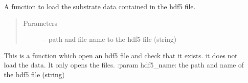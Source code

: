 \documentclass[letterpaper,10pt,english]{sphinxmanual}
\begin{document}

\begin{fulllineitems}
\label{\detokenize{index:src.load_hdf5.load_hdf5_sub}}
A function to load the substrate data contained in the hdf5 file.
\begin{quote}\begin{description}
\item[{Parameters}] \leavevmode
{} -- path and file name to the hdf5 file (string)

\end{description}\end{quote}

\end{fulllineitems}


\begin{fulllineitems}
\label{\detokenize{index:src.load_hdf5.open_hdf5}}
This is a function which open an hdf5 file and check that it exists. it does not load the data. It only opens the
files.
:param hdf5\_name: the path and name of the hdf5 file (string)

\end{fulllineitems}
\end{document}
